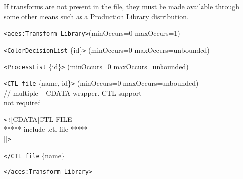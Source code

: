 If transforms are not present in the file, they must be made available through some other means such as a Production Library distribution.

\texttt{<aces:Transform\_Library>}\tabto{2in}(minOccurs=0 maxOccurs=1)

	\tabto{4em}\texttt{<ColorDecisionList} \{id\}\texttt{>} \tabto{3in}(minOccurs=0 maxOccurs=unbounded)\par
	\tabto{4em}\texttt{<ProcessList} \{id\}\texttt{>} \tabto{3in}(minOccurs=0 maxOccurs=unbounded)\par
	\tabto{4em}\texttt{<CTL file} \{name, id\}\texttt{>} \tabto{3in}(minOccurs=0 maxOccurs=unbounded) \\\tabto{3in}// multiple -- CDATA wrapper. CTL support \\\tabto{3.1in}not required\par
    \tabto{6em}\texttt{<!}[CDATA[CTL FILE ----\\
    \tabto{6.1em}***** include .ctl file *****\\
    \tabto{6em}]]\texttt{>}\par
	\tabto{4em}\texttt{</CTL file} \{name\}
	
\texttt{</aces:Transform\_Library>}
